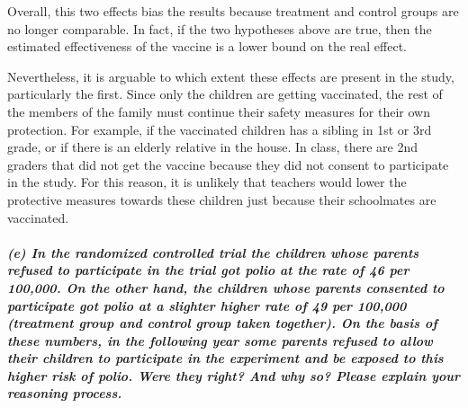 \documentclass[11pt, english]{article}
\begin{document}
Overall, this two effects bias the results because treatment and control
groups are no longer comparable. In fact, if the two hypotheses above
are true, then the estimated effectiveness of the vaccine is a lower
bound on the real effect.

Nevertheless, it is arguable to which extent these effects are present
in the study, particularly the first. Since only the children are
getting vaccinated, the rest of the members of the family must continue
their safety measures for their own protection. For example, if the
vaccinated children has a sibling in 1st or 3rd grade, or if there is an
elderly relative in the house. In class, there are 2nd graders that did
not get the vaccine because they did not consent to participate in the
study. For this reason, it is unlikely that teachers would lower the
protective measures towards these children just because their
schoolmates are vaccinated.

    \hypertarget{e-in-the-randomized-controlled-trial-the-children-whose-parents-refused-to-participate-in-the-trial-got-polio-at-the-rate-of-46-per-100000.-on-the-other-hand-the-children-whose-parents-consented-to-participate-got-polio-at-a-slighter-higher-rate-of-49-per-100000-treatment-group-and-control-group-taken-together.-on-the-basis-of-these-numbers-in-the-following-year-some-parents-refused-to-allow-their-children-to-participate-in-the-experiment-and-be-exposed-to-this-higher-risk-of-polio.-were-they-right-and-why-so-please-explain-your-reasoning-process.}{%
\subparagraph{(e) In the randomized controlled trial the children whose
parents refused to participate in the trial got polio at the rate of 46
per 100,000. On the other hand, the children whose parents consented to
participate got polio at a slighter higher rate of 49 per 100,000
(treatment group and control group taken together). On the basis of
these numbers, in the following year some parents refused to allow their
children to participate in the experiment and be exposed to this higher
risk of polio. Were they right? And why so? Please explain your
reasoning
process.\\[2ex]}\label{e-in-the-randomized-controlled-trial-the-children-whose-parents-refused-to-participate-in-the-trial-got-polio-at-the-rate-of-46-per-100000.-on-the-other-hand-the-children-whose-parents-consented-to-participate-got-polio-at-a-slighter-higher-rate-of-49-per-100000-treatment-group-and-control-group-taken-together.-on-the-basis-of-these-numbers-in-the-following-year-some-parents-refused-to-allow-their-children-to-participate-in-the-experiment-and-be-exposed-to-this-higher-risk-of-polio.-were-they-right-and-why-so-please-explain-your-reasoning-process.}}
\end{document}
